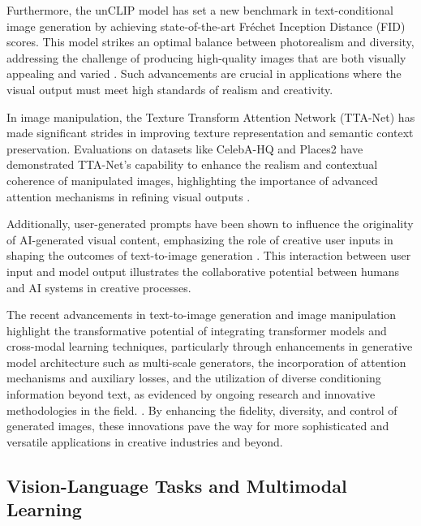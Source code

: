 Furthermore, the unCLIP model has set a new benchmark in text-conditional image generation by achieving state-of-the-art Fréchet Inception Distance (FID) scores. This model strikes an optimal balance between photorealism and diversity, addressing the challenge of producing high-quality images that are both visually appealing and varied \cite{Hierarchic5}. Such advancements are crucial in applications where the visual output must meet high standards of realism and creativity.



In image manipulation, the Texture Transform Attention Network (TTA-Net) has made significant strides in improving texture representation and semantic context preservation. Evaluations on datasets like CelebA-HQ and Places2 have demonstrated TTA-Net's capability to enhance the realism and contextual coherence of manipulated images, highlighting the importance of advanced attention mechanisms in refining visual outputs \cite{kim2020texturetransformattentionrealistic}.



Additionally, user-generated prompts have been shown to influence the originality of AI-generated visual content, emphasizing the role of creative user inputs in shaping the outcomes of text-to-image generation \cite{palmini2024patternscreativityuserinput}. This interaction between user input and model output illustrates the collaborative potential between humans and AI systems in creative processes.



The recent advancements in text-to-image generation and image manipulation highlight the transformative potential of integrating transformer models and cross-modal learning techniques, particularly through enhancements in generative model architecture such as multi-scale generators, the incorporation of attention mechanisms and auxiliary losses, and the utilization of diverse conditioning information beyond text, as evidenced by ongoing research and innovative methodologies in the field. \cite{ramesh2021zero}. By enhancing the fidelity, diversity, and control of generated images, these innovations pave the way for more sophisticated and versatile applications in creative industries and beyond.



\subsection{Vision-Language Tasks and Multimodal Learning} \label{subsec:Vision-Language Tasks and Multimodal Learning}

